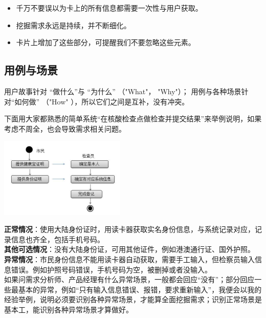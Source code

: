 \begin{itemize}
\tightlist
\item
  千万不要误以为卡上的所有信息都需要一次性与用户获取。
\item
  挖掘需求永远是持续，并不断细化。
\item
  卡片上增加了这些部分，可提醒我们不要忽略这些元素。
\end{itemize}

\hypertarget{ux7528ux4f8bux4e0eux573aux666f}{%
\subsection{用例与场景}\label{ux7528ux4f8bux4e0eux573aux666f}}

用户故事针对 ``做什么''与 ``为什么'' （"What"， "Why"）；
用例与各种场景针对``如何做'' （"How" ），所以它们之间是互补，没有冲突。

下面用大家都熟悉的简单系统``在核酸检查点做检查并提交结果''来举例说明，如果考虑不周全，也会导致需求相关问题。


\includegraphics[width=6cm]{CI场景图}

\textbf{正常情况}：使用大陆身份证时，用读卡器获取实名身份信息，与系统记录对应，记录信息也齐全，包括手机号码。\\
\textbf{其他可选情况}：没有大陆身份证，可用其他证件，例如港澳通行证、国外护照。\\
\textbf{异常情况}：市民身份信息不能用读卡器自动获取，需要手工输入，但检察员输入信息错误。例如护照号码错误，手机号码为空，被删掉或者没输入。\\
如果问需求分析师、产品经理有什么异常场景，一般都会回应``没有''；部分回应一些最基本的异常，例如``只有输入信息错误、报错，要求重新输入''，我便会以我的经验举例，说明必须要识别各种异常场景，才能算全面挖掘需求；识别正常场景是基本工，能识别各种异常场景才算做好。

